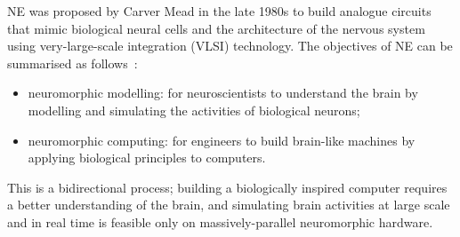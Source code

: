 NE was proposed by Carver Mead in the late 1980s \cite{Mead:1989:AVN:64998} to build analogue circuits that mimic biological neural cells and the architecture of the nervous system using very-large-scale integration (VLSI) technology.
The objectives of NE can be summarised as follows~\cite{furber2007neural}:
\begin{itemize}
	\item neuromorphic modelling: for neuroscientists to understand the brain by modelling and simulating the activities of biological neurons; 
	\item neuromorphic computing: for engineers to build brain-like machines by applying biological principles to computers.
\end{itemize}
This is a bidirectional process; building a biologically inspired computer requires a better understanding of the brain, and simulating brain activities at large scale and in real time is feasible only on massively-parallel neuromorphic hardware.



